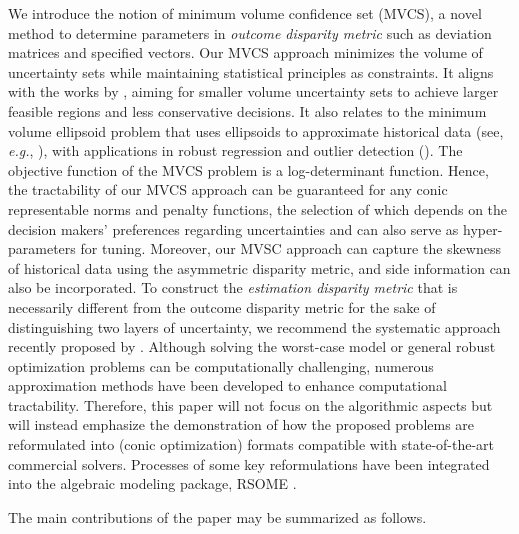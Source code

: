 \documentclass[opre, nonblindrev]{informswp}
\newcommand{\1}[1]{\mathds{1}{\left(#1\right)}}
\begin{document}
We introduce the notion of minimum volume confidence set (MVCS), a novel method to determine parameters in \emph{outcome disparity metric} such as deviation matrices and specified vectors. Our MVCS approach minimizes the volume of uncertainty sets while maintaining statistical principles as constraints. It aligns with the works by \cite{hong2021learning}, aiming for smaller volume uncertainty sets to achieve larger feasible regions and less conservative decisions.
It also relates to the minimum volume ellipsoid problem that uses ellipsoids to approximate historical data (see, \textit{e.g.}, \citealt{sun2004computation, mittal2022finding}), with applications in robust regression and outlier detection (\citealt{ahipacsaouglu2015fast, van2009minimum}). The objective function of the MVCS problem is a log-determinant function. Hence, the tractability of our MVCS approach can be guaranteed for any conic representable norms and penalty functions, the selection of which depends on the decision makers' preferences regarding uncertainties and can also serve as hyper-parameters for tuning. 
Moreover, our MVSC approach can capture the skewness of historical data using the asymmetric disparity metric, and side information can also be incorporated. 
To construct the \textit{estimation disparity metric} that is necessarily different from the outcome disparity metric for the sake of distinguishing two layers of uncertainty, we recommend the systematic approach recently proposed by \citealt{Zhu_Xie_Sim_2021joint}.  
Although solving the worst-case model or general robust optimization problems can be computationally challenging, numerous approximation methods have been developed to enhance computational tractability. Therefore, this paper will not focus on the algorithmic aspects but will instead emphasize the demonstration of how the proposed problems are reformulated into (conic optimization) formats compatible with state-of-the-art commercial solvers. Processes of some key reformulations have been integrated into the algebraic modeling package, RSOME \citep{Chen_Xiong_rsome}.

The main contributions of the paper may be summarized as follows.
\end{document}
